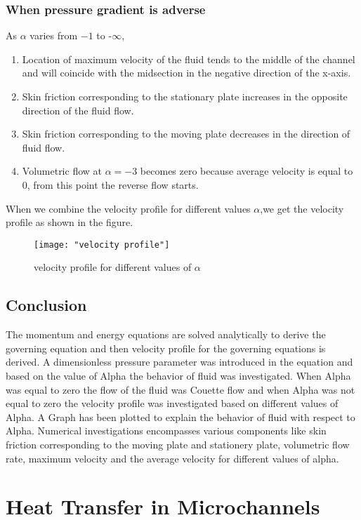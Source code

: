 \documentclass[14pt,one side, a4paper]{extbook}
\begin{document}
	 	\subsection{When pressure gradient is adverse}
	 	As $\alpha$ varies from $-1$ to -$\infty$,
	 	\begin{enumerate}
	 		\item {Location of maximum velocity of the fluid tends to the middle of the channel and will coincide with the midsection in the negative direction of the x-axis.} 
	 		\item {Skin friction corresponding to the stationary plate increases  in the opposite direction of the fluid flow.}
	 		\item {Skin friction corresponding to the moving plate decreases  in the direction of fluid flow.} 
	 		\item {Volumetric flow at $\alpha=-3$ becomes zero because average velocity is equal to $0$, from this point the reverse flow starts.}
	 	\end{enumerate}
	 	 When we combine the velocity profile for different values $\alpha$,we get the velocity profile as shown in the figure.
	 	\begin{figure}[ht]
	 		\centering
	 		\texttt{[image: "velocity profile"]}
	 		\caption{velocity profile for different values of $\alpha$}
	 		\label{fig:velocity-profile}
	 	\end{figure}
	 	\section{Conclusion}
	 	The momentum and energy equations are solved analytically to derive the governing equation and then velocity profile for the governing equations is derived. A dimensionless pressure parameter was introduced in the equation and based on the value of Alpha the behavior of fluid was investigated. When Alpha was equal to zero the flow of the fluid was Couette flow and when Alpha was not equal to zero the velocity profile was investigated based on different values of Alpha. A Graph has been plotted to explain the behavior of fluid with respect to Alpha. Numerical investigations encompasses various components like skin friction corresponding to the moving plate and stationery plate, volumetric flow rate, maximum velocity and the average velocity for different values of alpha.
	 	
	 	\chapter{Heat Transfer in Microchannels}
\end{document}
